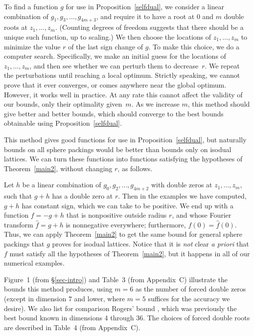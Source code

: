 To find a function $g$ for use in Proposition~\ref{selfdual}, we
consider a linear combination of $g_1,g_3,\dots,g_{4m+3}$, and
require it to have a root at $0$ and $m$ double roots at
$z_1,\dots,z_m$. (Counting degrees of freedom suggests that there
should be a unique such function, up to scaling.) We then choose
the locations of $z_1,\dots,z_m$ to minimize the value $r$ of the
last sign change of $g$.  To make this choice, we do a computer
search.  Specifically, we make an initial guess for the locations
of $z_1,\dots,z_m$, and then see whether we can perturb them to decrease~$r$.  We repeat the perturbations until
reaching a local optimum.  Strictly speaking, we cannot prove that it ever
converges, or comes anywhere near the global optimum.  However,
it works well in practice. At any rate this cannot affect the
validity of our bounds, only their optimality given~$m$. As we
increase $m$, this method should give better and better bounds,
which should converge to the best bounds obtainable using
Proposition~\ref{selfdual}.

This method gives good functions for use in
Proposition~\ref{selfdual}, but naturally bounds on all sphere
packings would be better than bounds only on isodual lattices. We
can turn these functions into functions satisfying the hypotheses
of Theorem~\ref{main2}, without changing $r$, as follows.


Let $h$ be a linear combination of $g_0, g_2,\dots, g_{4m+2}$
with double zeros at $z_1,\dots,z_m$, such that $g+h$ has a
double zero at $r$.  Then in the examples we have computed, $g+h$
has constant sign, which we can take to be positive. We end up
with a function $f= -g+h$ that is nonpositive outside radius
$r$, and whose Fourier transform $\widehat{f}=g+h$ is nonnegative
everywhere; furthermore, $f(0)=\widehat{f}(0)$.  Thus, we can
apply Theorem~\ref{main2} to get the same bound for general
sphere packings that $g$ proves for isodual lattices.  Notice
that it is {\it not} clear {\it a priori} that $f$ must satisfy all
the hypotheses of Theorem~\ref{main2}, but it happens in all of
our numerical examples.

Figure~1 (from \S\ref{sec-intro}) and
Table~3 (from Appendix~C)
illustrate the bounds this method produces, using $m=6$ as the
number of forced double zeros (except in dimension $7$ and lower,
where $m=5$ suffices for the accuracy we desire). We also list
for comparison Rogers' bound \cite{Ro}, which was previously the
best bound known in dimensions 4 through 36. The choices of
forced double roots are described in Table~4 (from
Appendix~C).


